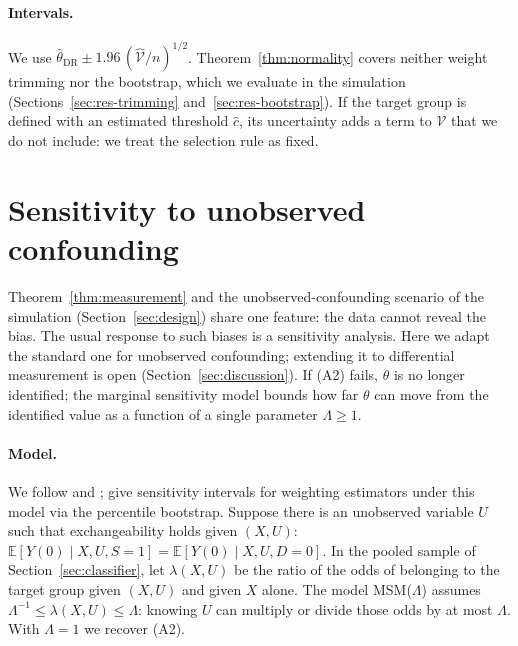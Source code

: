 \documentclass[11pt,a4paper]{article}
\newcommand{\E}{\mathbb{E}}
\theoremstyle{plain}
\theoremstyle{definition}
\begin{document}
\paragraph{Intervals.} We use $\hat\theta_{\mathrm{DR}}\pm1.96\,(\hat{\mathcal V}/n)^{1/2}$. Theorem~\ref{thm:normality} covers neither weight trimming nor the bootstrap, which we evaluate in the simulation (Sections~\ref{sec:res-trimming} and~\ref{sec:res-bootstrap}). If the target group is defined with an estimated threshold $\hat c$, its uncertainty adds a term to $\mathcal V$ that we do not include: we treat the selection rule as fixed.
\section{Sensitivity to unobserved confounding}\label{sec:sensitivity}

Theorem~\ref{thm:measurement} and the unobserved-confounding scenario of the simulation (Section~\ref{sec:design}) share one feature: the data cannot reveal the bias. The usual response to such biases is a sensitivity analysis. Here we adapt the standard one for unobserved confounding; extending it to differential measurement is open (Section~\ref{sec:discussion}). If (A2) fails, $\theta$ is no longer identified; the marginal sensitivity model bounds how far $\theta$ can move from the identified value as a function of a single parameter $\Lambda\ge1$.

\paragraph{Model.} We follow \citet{tan2006} and \citet{dorn2023}; \citet{zhao2019} give sensitivity intervals for weighting estimators under this model via the percentile bootstrap. Suppose there is an unobserved variable $U$ such that exchangeability holds given $(X,U)$: $\E[Y(0)\mid X,U,S=1]=\E[Y(0)\mid X,U,D=0]$. In the pooled sample of Section~\ref{sec:classifier}, let $\lambda(X,U)$ be the ratio of the odds of belonging to the target group given $(X,U)$ and given $X$ alone. The model MSM($\Lambda$) assumes $\Lambda^{-1}\le\lambda(X,U)\le\Lambda$: knowing $U$ can multiply or divide those odds by at most $\Lambda$. With $\Lambda=1$ we recover (A2).
\end{document}

